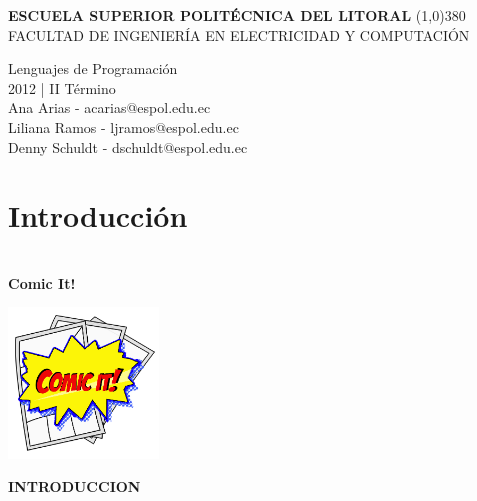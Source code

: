 \documentclass[12pt]{report}
\begin{document}
	\setlength{\topmargin}{-0.5in}
	\pagestyle{empty}
	\begin{center}
		\textbf{
			\vspace{-0.7em}
			ESCUELA SUPERIOR POLITÉCNICA DEL LITORAL
		}
		\line(1,0){380}\\		
		\scriptsize{FACULTAD DE INGENIERÍA EN ELECTRICIDAD Y COMPUTACIÓN}
	\end{center}
	\begin{center}
		\vspace{2.5em}
		Lenguajes de Programación
		\\2012 | II Término
		\vspace{1.5em}
		\\Ana Arias - acarias@espol.edu.ec
		\vspace{4mm}
		\\Liliana Ramos - ljramos@espol.edu.ec
		\\Denny Schuldt - dschuldt@espol.edu.ec



\tableofcontents

\chapter{Introducción}
		\vspace{2em}
		\Huge{\textbf{\\Comic It!	\vspace{1em}}}
	\end{center}	

\begin{center}
		\begingroup
			\includegraphics[width=0.30\textwidth]{imagenes_usuario/comicit.jpg}
		\endgroup
	\end{center}
	\begingroup
		\large{
			\textbf{
				INTRODUCCION
				\newline
				\newline
			}
		}
	\endgroup
\end{document}
